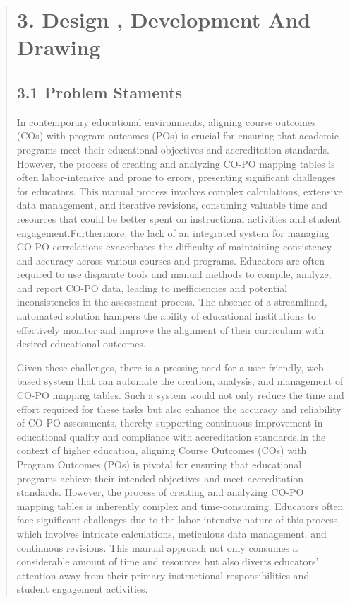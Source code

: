 \documentclass[12pt]{report}
\begin{document}
	
	\begin{quote}
		\section{ 3. Design , Development And Drawing}
		\subsection{3.1 Problem Staments}
		\hspace{1cm}In contemporary educational environments, aligning course outcomes (COs) with program outcomes (POs) is crucial for ensuring that academic programs meet their educational objectives and accreditation standards. However, the process of creating and analyzing CO-PO mapping tables is often labor-intensive and prone to errors, presenting significant challenges for educators. This manual process involves complex calculations, extensive data management, and iterative revisions, consuming valuable time and resources that could be better spent on instructional activities and student engagement.Furthermore, the lack of an integrated system for managing CO-PO correlations exacerbates the difficulty of maintaining consistency and accuracy across various courses and programs. Educators are often required to use disparate tools and manual methods to compile, analyze, and report CO-PO data, leading to inefficiencies and potential inconsistencies in the assessment process. The absence of a streamlined, automated solution hampers the ability of educational institutions to effectively monitor and improve the alignment of their curriculum with desired educational outcomes.
		
		Given these challenges, there is a pressing need for a user-friendly, web-based system that can automate the creation, analysis, and management of CO-PO mapping tables. Such a system would not only reduce the time and effort required for these tasks but also enhance the accuracy and reliability of CO-PO assessments, thereby supporting continuous improvement in educational quality and compliance with accreditation standards.In the context of higher education, aligning Course Outcomes (COs) with Program Outcomes (POs) is pivotal for ensuring that educational programs achieve their intended objectives and meet accreditation standards. However, the process of creating and analyzing CO-PO mapping tables is inherently complex and time-consuming. Educators often face significant challenges due to the labor-intensive nature of this process, which involves intricate calculations, meticulous data management, and continuous revisions. This manual approach not only consumes a considerable amount of time and resources but also diverts educators' attention away from their primary instructional responsibilities and student engagement activities.
		

\end{quote}
\end{document}
